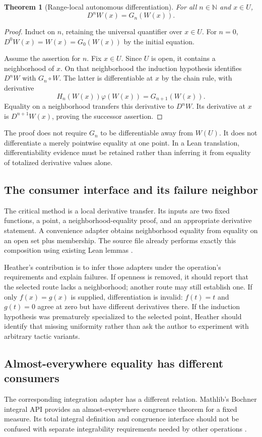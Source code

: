 \documentclass[11pt,letterpaper]{article}
\newcommand{\N}{\mathbb N}\newcommand{\Z}{\mathbb Z}\newcommand{\Q}{\mathbb Q}\newcommand{\R}{\mathbb R}
\newtheorem{theorem}{Theorem}[section]
\theoremstyle{definition}\newtheorem{definition}[theorem]{Definition}
\theoremstyle{remark}\newtheorem{remark}[theorem]{Remark}
\begin{document}
\begin{theorem}[Range-local autonomous differentiation]
For all $n\in\N$ and $x\in U$,
\[
 D^nW(x)=G_n(W(x)).
\]
\end{theorem}
\begin{proof}
Induct on $n$, retaining the universal quantifier over $x\in U$. For $n=0$,
$D^0W(x)=W(x)=G_0(W(x))$ by the initial equation.

Assume the assertion for $n$. Fix $x\in U$. Since $U$ is open, it contains a
neighborhood of $x$. On that neighborhood the induction hypothesis identifies
$D^nW$ with $G_n\circ W$. The latter is differentiable at $x$ by the chain
rule, with derivative
\[
 H_n(W(x))\varphi(W(x))=G_{n+1}(W(x)).
\]
Equality on a neighborhood transfers this derivative to $D^nW$. Its derivative
at $x$ is $D^{n+1}W(x)$, proving the successor assertion.
\end{proof}

The proof does not require $G_n$ to be differentiable away from $W(U)$.
It does not differentiate a merely pointwise equality at one point. In a Lean
translation, differentiability evidence must be retained rather than inferring
it from equality of totalized derivative values alone.

\subsection{The consumer interface and its failure neighbor}
The critical method is a local derivative transfer. Its inputs are two fixed
functions, a point, a neighborhood-equality proof, and an appropriate derivative
statement. A convenience adapter obtains neighborhood equality from equality
on an open set plus membership. The source file already performs exactly this
composition using existing Lean lemmas \cite{autonomous}.

Heather's contribution is to infer those adapters under the operation's
requirements and explain failures. If openness is removed, it should report
that the selected route lacks a neighborhood; another route may still establish
one. If only $f(x)=g(x)$ is supplied, differentiation is invalid: $f(t)=t$ and
$g(t)=0$ agree at zero but have different derivatives there. If the induction
hypothesis was prematurely specialized to the selected point, Heather should
identify that missing uniformity rather than ask the author to experiment
with arbitrary tactic variants.

\subsection{Almost-everywhere equality has different consumers}
The corresponding integration adapter has a different relation. Mathlib's
Bochner integral API provides an almost-everywhere congruence theorem for a
fixed measure. Its total integral definition and congruence interface should
not be confused with separate integrability requirements needed by other
operations \cite{bochner}.
\end{document}
